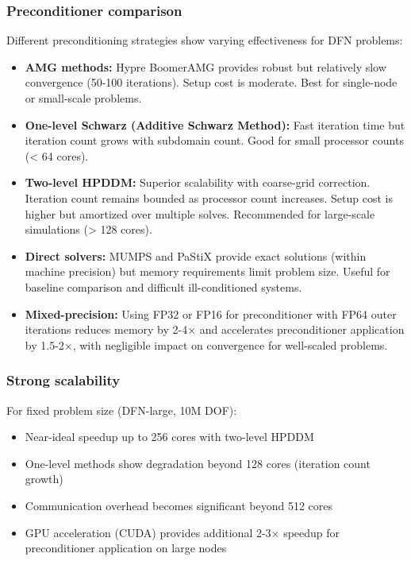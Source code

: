 \subsubsection{Preconditioner comparison}

Different preconditioning strategies show varying effectiveness for DFN problems:

\begin{itemize}
\item \textbf{AMG methods:} Hypre BoomerAMG provides robust but relatively slow convergence (50-100 iterations). Setup cost is moderate. Best for single-node or small-scale problems.

\item \textbf{One-level Schwarz (Additive Schwarz Method):} Fast iteration time but iteration count grows with subdomain count. Good for small processor counts (< 64 cores).

\item \textbf{Two-level HPDDM:} Superior scalability with coarse-grid correction. Iteration count remains bounded as processor count increases. Setup cost is higher but amortized over multiple solves. Recommended for large-scale simulations (> 128 cores).

\item \textbf{Direct solvers:} MUMPS and PaStiX provide exact solutions (within machine precision) but memory requirements limit problem size. Useful for baseline comparison and difficult ill-conditioned systems.

\item \textbf{Mixed-precision:} Using FP32 or FP16 for preconditioner with FP64 outer iterations reduces memory by 2-4× and accelerates preconditioner application by 1.5-2×, with negligible impact on convergence for well-scaled problems.
\end{itemize}

\subsubsection{Strong scalability}

For fixed problem size (DFN-large, 10M DOF):
\begin{itemize}
\item Near-ideal speedup up to 256 cores with two-level HPDDM
\item One-level methods show degradation beyond 128 cores (iteration count growth)
\item Communication overhead becomes significant beyond 512 cores
\item GPU acceleration (CUDA) provides additional 2-3× speedup for preconditioner application on large nodes
\end{itemize}

